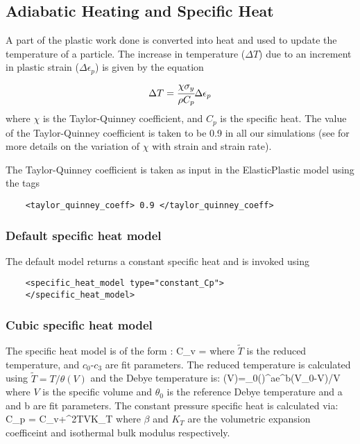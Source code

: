   \subsection{Adiabatic Heating and Specific Heat}
  A part of the plastic work done is converted into heat and used to update the
  temperature of a particle.  The increase in temperature ($\Delta T$) due to
  an increment in plastic strain ($\Delta\epsilon_p$) is given by the equation
  \begin{equation}
    \Delta T = \cfrac{\chi\sigma_y}{\rho C_p} \Delta \epsilon_p
  \end{equation}
  where $\chi$ is the Taylor-Quinney coefficient, and $C_p$ is the specific
  heat.  The value of the Taylor-Quinney coefficient is taken to be 0.9
  in all our simulations (see \cite{Ravi01} for more details on the
  variation of $\chi$ with strain and strain rate).

  The Taylor-Quinney coefficient is taken as input in the ElasticPlastic model
  using the tags
  \begin{lstlisting}
    <taylor_quinney_coeff> 0.9 </taylor_quinney_coeff>
  \end{lstlisting}

  \subsubsection{Default specific heat model}
  The default model returns a constant specific heat and is invoked using
  \begin{lstlisting}
    <specific_heat_model type="constant_Cp">
    </specific_heat_model>
  \end{lstlisting}

  \subsubsection{Cubic specific heat model}
  The specific heat model is of the form \cite{Menikoff2003}:
  \Beq
    C_v =  
  \Eeq
  where $\tilde{T}$ is the reduced temperature, and $c_0$-$c_3$ are fit parameters.
  The reduced temperature is calculated using $\tilde{T}=T/\theta (V)$ and the
  Debye temperature is:
  \Beq
    \theta (V)=\theta_0\left(\right)^ae^{b\left(V_0-V\right)/V}
  \Eeq
  where $V$ is the specific volume and $\theta_0$ is the reference Debye temperature and
  a and b are fit parameters.
  The constant pressure specific heat is calculated via:
  \Beq
    C_p = C_v+\beta^2TVK_T
  \Eeq
  where $\beta$ and $K_T$ are the volumetric expansion coefficeint and 
  isothermal bulk modulus respectively.
  
